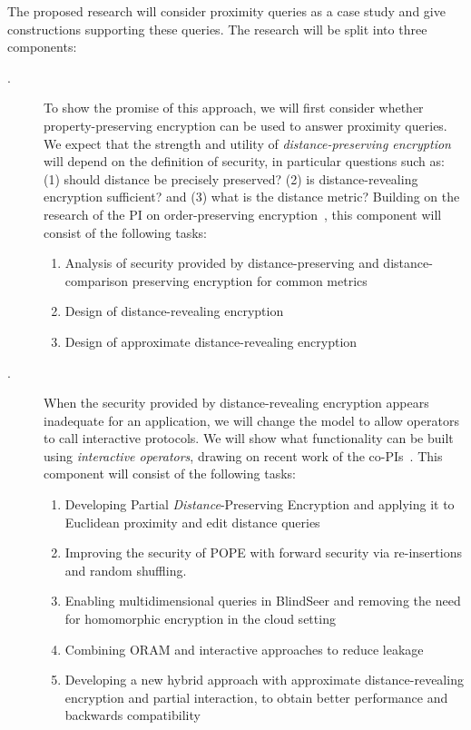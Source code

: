 \noindent
The proposed research will
consider proximity queries as a case study and give constructions supporting
these queries.  The research will be split into three components:
\begin{description}
\item[.] To show the promise of this approach, we
will first consider whether property-preserving encryption can be used
to answer proximity queries.  We expect that the strength and utility of
\emph{distance-preserving encryption} will depend on the definition of
security, in particular questions such as: (1) should distance be precisely preserved? 
(2) is distance-revealing encryption sufficient? and (3) what is the distance
metric? Building on the research of the PI on order-preserving
encryption~\cite{EC:BCLO09,C:BolCheONe11}, this component will consist
of the following tasks:
\begin{enumerate}
\setlength\itemsep{0em}
\item Analysis of security provided by distance-preserving and distance-comparison preserving encryption for common metrics
\item Design of distance-revealing encryption
\item Design of approximate distance-revealing encryption
\end{enumerate}

\item[.] When the security provided by
distance-revealing encryption appears inadequate for an application, we
will change the model to allow operators to call interactive protocols.
We will show what functionality can be built using \emph{interactive
operators}, drawing on recent work of the
co-PIs~\cite{SP:PKVKMC14,CCS:RACY16}.  This component will consist of
the following tasks:
\begin{enumerate}
\setlength\itemsep{0em}
\item Developing Partial \emph{Distance}-Preserving Encryption and
  applying it to Euclidean proximity and edit distance queries
\item Improving the security of POPE with forward security via
  re-insertions and random shuffling.
\item Enabling multidimensional queries in BlindSeer and removing
  the need for homomorphic encryption in the cloud setting
\item Combining ORAM and interactive approaches to reduce leakage
\item Developing a new hybrid approach with approximate
  distance-revealing encryption and partial interaction, to obtain
  better performance and backwards compatibility
\end{enumerate}


\end{description}
